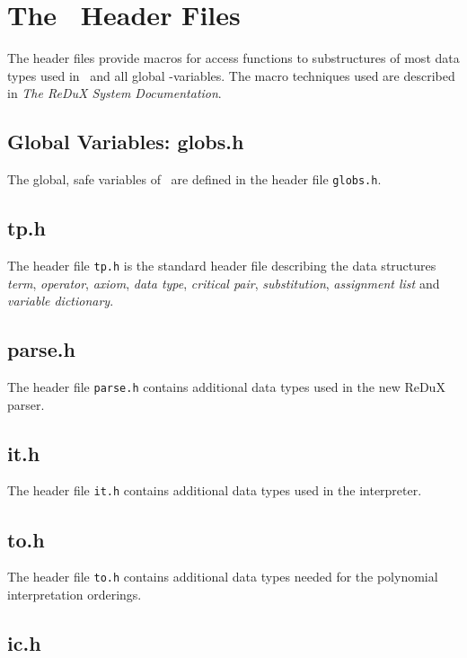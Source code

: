 \section{The \protect\redux\  Header Files} \label{ap:hd}

The header files provide macros for access functions to substructures of
most data types used in \redux\ and all global \redux-variables. 
The macro techniques used are described in {\em The ReDuX System
Documentation}.


\subsection*{Global Variables: globs.h}
\label{Ap:gv}
The global, safe variables of \redux\ are defined in the header file
{\tt globs.h}.


\subsection*{tp.h}

The header file {\tt tp.h} is the standard header file describing the data
structures  {\em term}, {\em operator}, {\em axiom}, {\em data type},
{\em critical pair}, {\em substitution}, {\em assignment list}
and {\em variable dictionary}.


\subsection*{parse.h}

The header file {\tt parse.h} contains additional data types used in the
new ReDuX parser.


\subsection*{it.h}

The header file {\tt it.h} contains additional data types used in the
interpreter.


\subsection*{to.h}

The header file {\tt to.h} contains additional data types
needed for the polynomial interpretation orderings.


\subsection*{ic.h}

